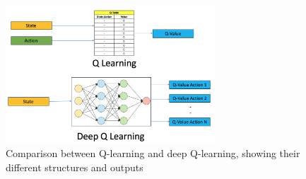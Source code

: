\begin{figure}[H]
  \centering
  \includegraphics[width=0.7\textwidth]{figures/images/q_vs_dq.png}
  \caption[Q-learning vs deep Q-learning]{Comparison between Q-learning and deep Q-learning, showing their different structures and outputs  \cite{vidhya2019introduction}}
  \label{fig:q_vs_dq}
\end{figure}
